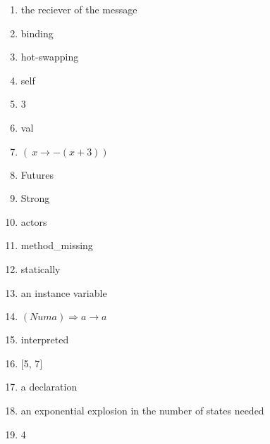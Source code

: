 \documentclass{exam}
\begin{document}
\begin{enumerate}
\item the reciever of the message
\item binding
\item hot-swapping
\item self
\item 3
\item val
\item $(\ x \rightarrow - (x + 3))$
\item Futures
\item Strong
\item actors
\item method\_missing
\item statically
\item an instance variable
\item $(Num a) \Rightarrow a \rightarrow a$
\item interpreted
\item $\lbrack$5, 7$\rbrack$
\item a declaration
\item an exponential explosion in the number of states needed
\item 4
\end{enumerate}
\end{document}
